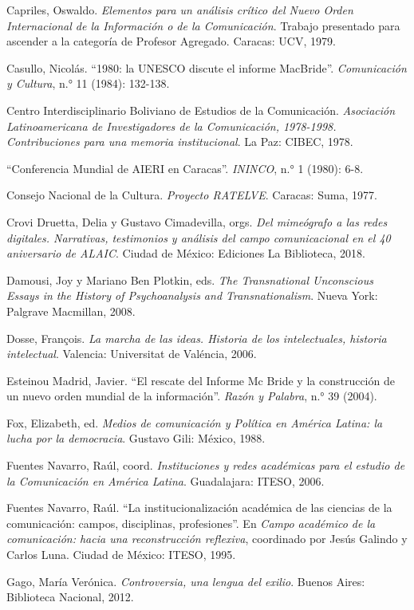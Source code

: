 \documentclass{tufte-handout}
\begin{document}
\begin{hangparas}{.25in}{1}
Capriles, Oswaldo. \emph{Elementos para un análisis crítico del Nuevo
Orden Internacional de la Información o de la Comunicación}. Trabajo
presentado para ascender a la categoría de Profesor Agregado. Caracas:
UCV, 1979.

Casullo, Nicolás. ``1980: la UNESCO discute el informe MacBride''.
\emph{Comunicación y Cultura}, n.° 11 (1984): 132-138.

Centro Interdisciplinario Boliviano de Estudios de la Comunicación.
\emph{Asociación Latinoamericana de Investigadores de la Comunicación,
1978-1998. Contribuciones para una memoria institucional}. La Paz:
CIBEC, 1978.

``Conferencia Mundial de AIERI en Caracas''. \emph{ININCO}, n.° 1
(1980): 6-8.

Consejo Nacional de la Cultura. \emph{Proyecto RATELVE}. Caracas: Suma,
1977.

Crovi Druetta, Delia y Gustavo Cimadevilla, orgs. \emph{Del mimeógrafo a
las redes digitales. Narrativas, testimonios y análisis del campo
comunicacional en el 40 aniversario de ALAIC}. Ciudad de México:
Ediciones La Biblioteca, 2018.

Damousi, Joy y Mariano Ben Plotkin, eds. \emph{The Transnational
Unconscious Essays in the History of Psychoanalysis and
Transnationalism}. Nueva York: Palgrave Macmillan, 2008.

Dosse, François. \emph{La marcha de las ideas. Historia de los
intelectuales, historia intelectual}. Valencia: Universitat de Valéncia,
2006.

Esteinou Madrid, Javier. ``El rescate del Informe Mc Bride y la
construcción de un nuevo orden mundial de la información''. \emph{Razón
y Palabra}, n.° 39 (2004).

Fox, Elizabeth, ed. \emph{Medios de comunicación y Política en América
Latina: la lucha por la democracia}. Gustavo Gili: México, 1988.

Fuentes Navarro, Raúl, coord. \emph{Instituciones y redes académicas
para el estudio de la Comunicación en América Latina}. Guadalajara:
ITESO, 2006.

Fuentes Navarro, Raúl. ``La institucionalización académica de las
ciencias de la comunicación: campos, disciplinas, profesiones''. En
\emph{Campo académico de la comunicación: hacia una reconstrucción
reflexiva}, coordinado por Jesús Galindo y Carlos Luna. Ciudad de
México: ITESO, 1995.

Gago, María Verónica. \emph{Controversia, una lengua del exilio}. Buenos
Aires: Biblioteca Nacional, 2012.


\end{hangparas}
\end{document}
